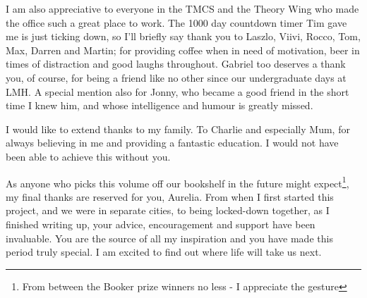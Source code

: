 I am also appreciative to everyone in the TMCS and the Theory Wing who made the office such a great place to work.
The 1000 day countdown timer Tim gave me is just ticking down, so I'll briefly say thank you to Laszlo, Viivi, Rocco, Tom, Max, Darren and Martin; for providing coffee when in need of motivation, beer in times of distraction and good laughs throughout.
Gabriel too deserves a thank you, of course, for being a friend like no other since our undergraduate days at LMH.
A special mention also for Jonny, who became a good friend in the short time I knew him, and whose intelligence and humour is greatly missed. 

I would like to extend thanks to my family. 
To Charlie and especially Mum, for always believing in me and providing a fantastic education.
I would not have been able to achieve this without you.

As anyone who picks this volume off our bookshelf in the future might expect\footnote{From between the Booker prize winners no less \-- I appreciate the gesture}, my final thanks are reserved for you, Aurelia.
From when I first started this project, and we were in separate cities, to being locked\--down together, as I finished writing up, your advice, encouragement and support have been invaluable.
You are the source of all my inspiration and you have made this period truly special.
I am excited to find out where life will take us next.